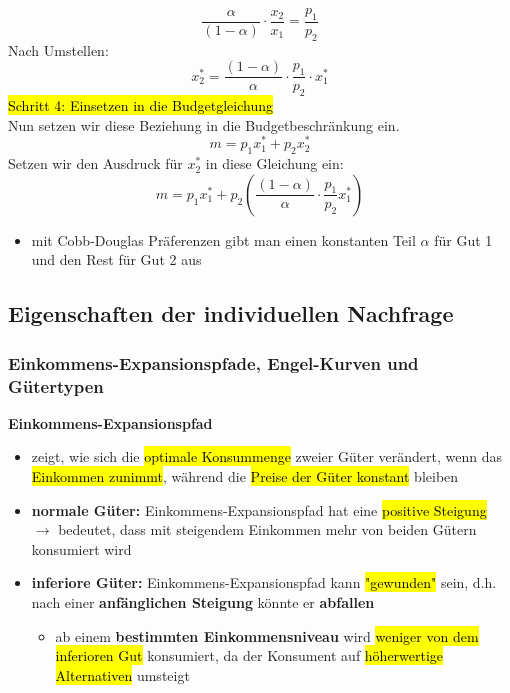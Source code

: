 \documentclass[a4paper, 10pt]{article}
\begin{document}
\[
    \frac{\alpha}{(1 - \alpha)} \cdot \frac{x_2}{x_1} = \frac{p_1}{p_2}
\]
Nach Umstellen:
\[
    x_2^* = \frac{(1 - \alpha)}{\alpha} \cdot \frac{p_1}{p_2} \cdot x_1^*
\]
\hl{Schritt 4: Einsetzen in die Budgetgleichung}\\[1.5mm]
Nun setzen wir diese Beziehung in die Budgetbeschränkung ein.
\[
    m = p_1 x_1^* + p_2 x_2^*
\]
Setzen wir den Ausdruck für $x_2^*$ in diese Gleichung ein:
\[
    m = p_1 x_1^* + p_2 (\frac{(1- \alpha)}\alpha{} \cdot \frac{p_1}{p_2} x_1^*)
\]
\begin{itemize}
    \item mit Cobb-Douglas Präferenzen gibt man einen konstanten Teil $\alpha$ für Gut 1 und den Rest für Gut 2 aus
\end{itemize}
\subsection{Eigenschaften der individuellen Nachfrage}
\subsubsection{Einkommens-Expansionspfade, Engel-Kurven und Gütertypen}
\textbf{Einkommens-Expansionspfad}
\begin{itemize}
    \item zeigt, wie sich die \hl{optimale Konsummenge} zweier Güter verändert, wenn das \hl{Einkommen zunimmt}, während die \hl{Preise der Güter konstant} bleiben
    \item \textbf{normale Güter:} Einkommens-Expansionspfad hat eine \hl{positive Steigung} $\rightarrow$ bedeutet, dass mit steigendem Einkommen mehr von beiden Gütern konsumiert wird
    \item \textbf{inferiore Güter:} Einkommens-Expansionspfad kann \hl{"gewunden"} sein, d.h. nach einer \textbf{anfänglichen Steigung} könnte er \textbf{abfallen}
    \begin{itemize}
        \item ab einem \textbf{bestimmten Einkommensniveau} wird \hl{weniger von dem inferioren Gut} konsumiert, da der Konsument auf \hl{höherwertige Alternativen} umsteigt
    \end{itemize}
\end{itemize}
\end{document}
